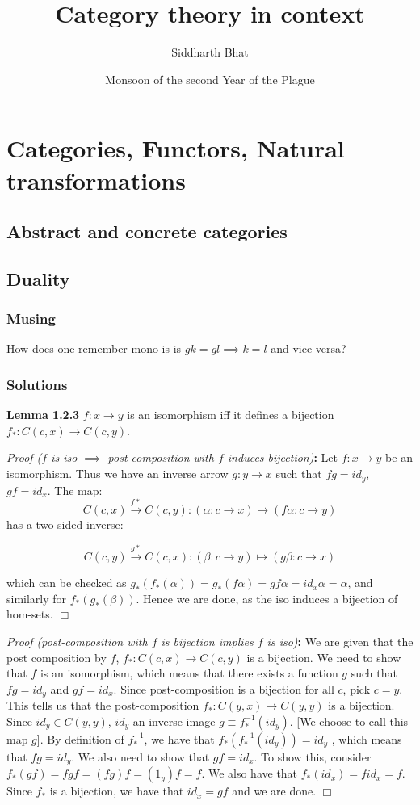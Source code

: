 \documentclass[11pt]{book}
\title{Category theory in context}
\author{Siddharth Bhat}
\date{Monsoon of the second Year of the Plague}
\def\qed{$\Box$}
\newcommand{\beginproof}[1][]{\emph{Proof #1}\textbf{:} }
\newcommand{\question}[1]{\textbf{#1}}
\begin{document}
\maketitle
\tableofcontents
\chapter{Categories, Functors, Natural transformations}
\section{Abstract and concrete categories}
\section{Duality}

\subsection{Musing}
How does one remember mono is is $gk = gl \implies k = l$ and vice versa?

\subsection{Solutions}
\question{Lemma 1.2.3} $f: x \to y$ is an isomorphism iff it defines a bijection $f_*: C(c, x) \to C(c, y)$.


\beginproof[($f$ is iso $\implies$ post composition with $f$ induces bijection)]
Let $f: x \to y$ be an isomorphism. Thus we have an inverse arrow $g: y \to x$ such that $fg = id_y$, $gf = id_x$.
The map: $$C(c, x) \xrightarrow{f*} C(c, y): (\alpha: c \to x) \mapsto (f\alpha: c \to y)$$
has a two sided inverse:

$$
C(c, y) \xrightarrow{g*} C(c, x): (\beta: c \to y) \mapsto (g\beta: c \to x)
$$

which can be checked as $g_*(f_*(\alpha)) = g_*(f\alpha) = gf\alpha = id_x\alpha = \alpha$, and similarly for $f_*(g_*(\beta))$.
Hence we are done, as the iso induces a bijection of hom-sets.
\qed


\beginproof[(post-composition with $f$ is bijection implies $f$ is iso)]
We are given that the post composition by $f$, $f_*: C(c, x) \rightarrow C(c, y)$ is a bijection.
We need to show that $f$ is an isomorphism, which means that there exists a function $g$ such that $fg = id_y$ and $gf = id_x$.
Since post-composition is a bijection for all $c$, pick $c = y$. This tells us that the post-composition 
$f_*: C(y, x) \rightarrow C(y, y)$ is a bijection. Since $id_y \in C(y, y)$, $id_y$ an inverse image $g \equiv f_*^{-1}(id_y)$. 
[We choose to call this map $g$]. By definition of $f_*^{-1}$, we have that $f_*(f_*^{-1}(id_y)) = id_y$ , which means
that $fg = id_y$. We also need to show that $gf = id_x$. To show this, consider $f_*(gf) = fgf = (fg)f = (1_y)f = f$.
We also have that $f_*(id_x) = f id_x = f$. Since $f_*$ is a bijection, we have that $id_x = gf$ and we are done.  \qed
\end{document}
